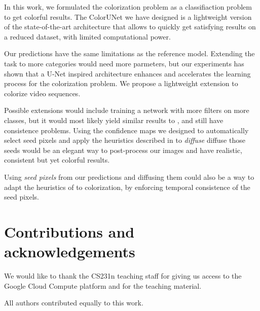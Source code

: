 \documentclass[10pt,twocolumn,letterpaper]{article}
\begin{document}
In this work, we formulated the colorization problem as a classifiaction problem to get colorful results. The ColorUNet we have designed is a lightweight version of the state-of-the-art architecture that allows to quickly get satisfying results on a reduced dataset, with limited computational power. 

Our predictions have the same limitations as the reference model. Extending the task to more categories would need more parmeters, but our experiments has shown that a U-Net inspired architecture enhances and accelerates the learning process for the colorization problem. We propose a lightweight extension to colorize video sequences. 

Possible extensions would include training a network with more filters on more classes, but it would most likely yield similar results to \cite{zhang2016colorful}, and still have consistence problems. Using the confidence maps we designed to automatically select seed pixels and apply the heuristics described in \cite{levin2004colorization} to \textit{diffuse} diffuse those seeds would be an elegant way to post-process our images and have realistic, consistent but yet colorful results. 

Using \textit{seed pixels} from our predictions and diffusing them could also be a way to adapt the heuristics of \cite{zhu2017video} to colorization, by enforcing temporal consistence of the seed pixels. 


\clearpage 

\section*{Contributions and acknowledgements}

We would like to thank the CS231n teaching staff for giving us access to the Google Cloud Compute platform and for the teaching material. 

All authors contributed equally to this work. 

{\small


}
\end{document}

